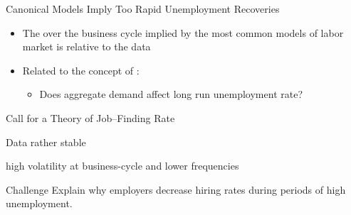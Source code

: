 \begin{frame}{Canonical Models Imply Too Rapid Unemployment Recoveries}
\begin{itemize}
    \item The  over the business cycle implied by the most common models of labor market  is  relative to the data
    \item Related to the concept of :
    \begin{itemize}
        \item Does aggregate demand affect long run unemployment rate?
    \end{itemize}
\end{itemize}
\end{frame}
\begin{frame}[c,label=from-job-rates]{Call for a Theory of Job--Finding Rate}
\begin{block}{Data}
         rather stable

          high volatility at
    business-cycle and lower frequencies

    \hyperlink{job-rates}{}
\end{block}
\pause
\medskip
\begin{block}{Challenge}
    {
    Explain why employers decrease hiring rates during periods of high unemployment.
    }
\end{block}
 \note{~}
\end{frame}
